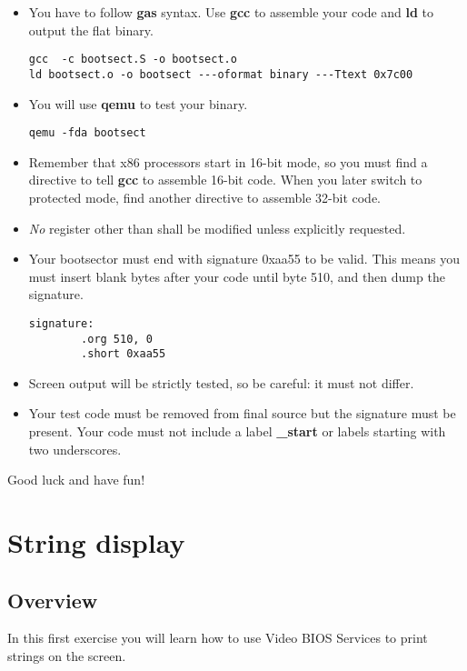 \begin{itemize}
\item
  You have to follow \textbf{gas} syntax. Use \textbf{gcc} to assemble your
  code and \textbf{ld} to output the flat binary.
  \begin{verbatim}
gcc  -c bootsect.S -o bootsect.o
ld bootsect.o -o bootsect ---oformat binary ---Ttext 0x7c00
  \end{verbatim}
\item
  You will use \textbf{qemu} to test your binary.
  \begin{verbatim}
qemu -fda bootsect
  \end{verbatim}
\item
  Remember that x86 processors start in 16-bit mode, so you must find a
  directive to tell \textbf{gcc} to assemble 16-bit code. When you later
  switch to protected mode, find another directive to assemble 32-bit code.
\item
  \emph{No} register other than  shall be modified unless explicitly requested.
\item
  Your bootsector must end with signature 0xaa55 to be valid. This means you
  must insert blank bytes after your code until byte 510, and then dump
  the signature.
  \begin{verbatim}
signature:
        .org 510, 0
        .short 0xaa55
  \end{verbatim}
\item
  Screen output will be strictly tested, so be careful: it must not differ.
\item
  Your test code must be removed from final source but the signature must be
  present. Your code must not include a label \textbf{\_start} or labels
  starting with two underscores.
\end{itemize}

Good luck and have fun!

%
%

\newpage

\section{String display}

\subsection*{Overview}
In this first exercise you will learn how to use Video BIOS Services to
print strings on the screen.

